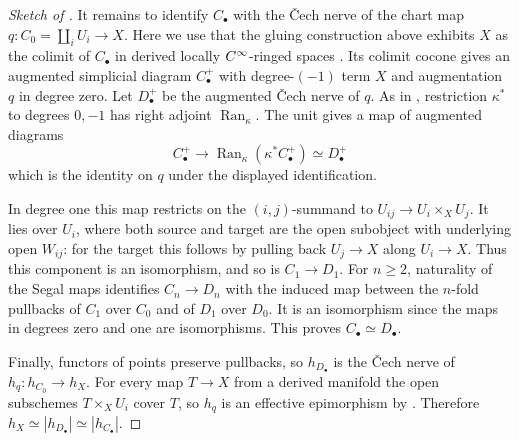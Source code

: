 \begin{proof}[Sketch of ]
It remains to identify $C_\bullet$ with the \v{C}ech nerve of the chart
map $q\colon C_0=\coprod_i U_i\to X$. Here we use that the gluing
construction above exhibits $X$ as the colimit of $C_\bullet$ in
derived locally $C^\infty$-ringed spaces
\cite[Proposition~2.1.18(2) and Remark~2.1.19]{Steffens_Representability_Elliptic_Moduli}.
Its colimit cocone gives an augmented simplicial diagram $C^+_\bullet$
with degree-$(-1)$ term $X$ and augmentation $q$ in degree zero.
Let $D^+_\bullet$ be the augmented \v{C}ech nerve of $q$. As in
, restriction $\kappa^*$ to degrees
$0,-1$ has right adjoint $\operatorname{Ran}_{\kappa}$. The unit gives a map
of augmented diagrams
\[
 C^+_\bullet\longrightarrow \operatorname{Ran}_{\kappa}(\kappa^*C^+_\bullet)
 \simeq D^+_\bullet
\]
which is the identity on $q$ under the displayed identification.

In degree one this map restricts on the $(i,j)$-summand to
$U_{ij}\to U_i\times_X U_j$. It lies over $U_i$, where both source
and target are the open subobject with underlying open $W_{ij}$:
for the target this follows by pulling back $U_j\to X$ along
$U_i\to X$. Thus this component is an isomorphism, and so is
$C_1\to D_1$. For $n\geq 2$, naturality of the Segal maps identifies
$C_n\to D_n$ with the induced map between the $n$-fold pullbacks
of $C_1$ over $C_0$ and of $D_1$ over $D_0$. It is an isomorphism
since the maps in degrees zero and one are isomorphisms. This proves
$C_\bullet\simeq D_\bullet$.

Finally, functors of points preserve pullbacks, so $h_{D_\bullet}$ is
the \v{C}ech nerve of $h_q\colon h_{C_0}\to h_X$. For every map $T\to X$ from a derived manifold the open subschemes $T\times_XU_i$ cover $T$, so $h_q$ is an
effective epimorphism by .
Therefore $h_X\simeq|h_{D_\bullet}|\simeq|h_{C_\bullet}|$.
\end{proof}

